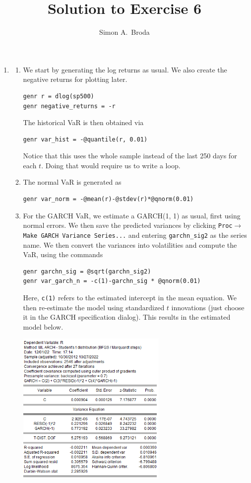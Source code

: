 \documentclass[11pt, a4paper]{article}
\begin{document}
\title{Solution to Exercise 6}
\author{Simon A.\ Broda}
\date{}
\maketitle

\begin{enumerate}


\item
\begin{enumerate}
\item We start by generating the log returns as usual. We also create the negative returns for plotting later.
\begin{verbatim}
genr r = dlog(sp500)
genr negative_returns = -r
\end{verbatim}
The historical VaR is then obtained via
\begin{verbatim}
genr var_hist = -@quantile(r, 0.01)
\end{verbatim}
Notice that this uses the whole sample instead of the last 250 days for each $t$. Doing that would require us to write a loop.
\item The normal VaR is generated as
\begin{verbatim}
genr var_norm = -@mean(r)-@stdev(r)*@qnorm(0.01)
\end{verbatim}
\item For the GARCH VaR, we estimate a GARCH(1, 1) as usual, first using normal errors. We then save the predicted variances by clicking \texttt{Proc$\rightarrow$Make GARCH Variance Series...} and entering \verb.garchn_sig2. as the series name. We then convert the variances into volatilities and compute the VaR, using the commands
\begin{verbatim}
genr garchn_sig = @sqrt(garchn_sig2)
genr var_garch_n = -c(1)-garchn_sig * @qnorm(0.01)
\end{verbatim}
Here, \texttt{c(1)} refers to the estimated intercept in the mean equation. We then re-estimate the model using standardized $t$ innovations (just choose it in the GARCH specification dialog). This results in the estimated model below.
\begin{center}
\includegraphics[width=0.6\textwidth]{GARCHt}

\end{center}
\end{enumerate}
\end{enumerate}
\end{document}
